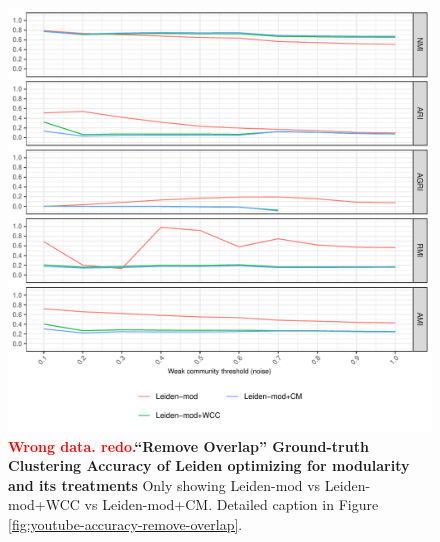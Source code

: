 \documentclass[aps,pre,superscriptaddress]{revtex4}
\begin{document}
\begin{figure}[!htpb]
	\centering
	\includegraphics[]{figures/remove_overlap_youtube_leiden_mod_accuracy.pdf}
	\caption[]{\textbf{\textcolor{red}{Wrong data. redo.}``Remove Overlap'' Ground-truth Clustering Accuracy of Leiden optimizing for modularity and its treatments} Only showing Leiden-mod vs Leiden-mod+WCC vs Leiden-mod+CM. Detailed caption in Figure \ref{fig:youtube-accuracy-remove-overlap}.}
	\label{fig:remove-overlap-leiden-mod}
\end{figure}
\end{document}
